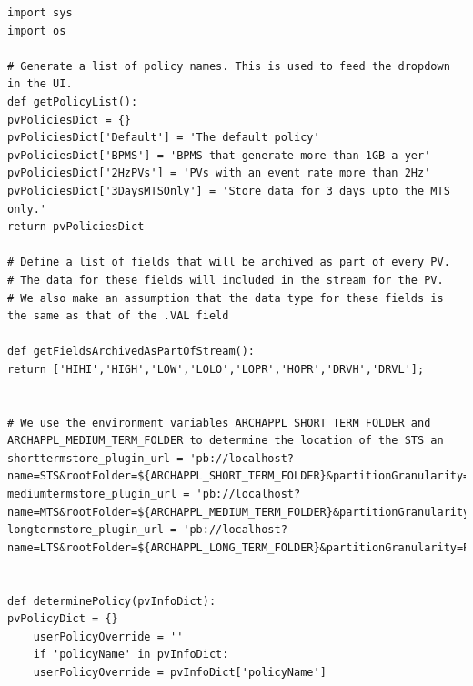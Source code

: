 \documentclass[11pt
  , a4paper
  , article
  , oneside
]{memoir}
\begin{document}
\begin{lstlisting}[style=termstyle]
import sys
import os

# Generate a list of policy names. This is used to feed the dropdown in the UI.
def getPolicyList():
pvPoliciesDict = {}
pvPoliciesDict['Default'] = 'The default policy'
pvPoliciesDict['BPMS'] = 'BPMS that generate more than 1GB a yer'
pvPoliciesDict['2HzPVs'] = 'PVs with an event rate more than 2Hz'
pvPoliciesDict['3DaysMTSOnly'] = 'Store data for 3 days upto the MTS only.'
return pvPoliciesDict

# Define a list of fields that will be archived as part of every PV.
# The data for these fields will included in the stream for the PV.
# We also make an assumption that the data type for these fields is the same as that of the .VAL field

def getFieldsArchivedAsPartOfStream():
return ['HIHI','HIGH','LOW','LOLO','LOPR','HOPR','DRVH','DRVL'];


# We use the environment variables ARCHAPPL_SHORT_TERM_FOLDER and ARCHAPPL_MEDIUM_TERM_FOLDER to determine the location of the STS an
shorttermstore_plugin_url = 'pb://localhost?name=STS&rootFolder=${ARCHAPPL_SHORT_TERM_FOLDER}&partitionGranularity=PARTITION_HOUR&con
mediumtermstore_plugin_url = 'pb://localhost?name=MTS&rootFolder=${ARCHAPPL_MEDIUM_TERM_FOLDER}&partitionGranularity=PARTITION_DAY&ho
longtermstore_plugin_url = 'pb://localhost?name=LTS&rootFolder=${ARCHAPPL_LONG_TERM_FOLDER}&partitionGranularity=PARTITION_YEAR'


def determinePolicy(pvInfoDict):
pvPolicyDict = {}
    userPolicyOverride = ''
    if 'policyName' in pvInfoDict:
    userPolicyOverride = pvInfoDict['policyName']
    

\end{lstlisting}
\end{document}
